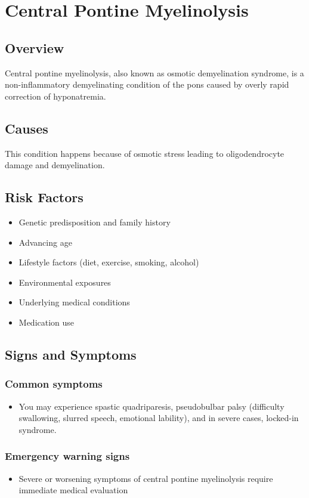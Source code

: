 \chapter{Central Pontine Myelinolysis}
\label{sec:Central Pontine Myelinolysis}

\section{Overview}
Central pontine myelinolysis, also known as osmotic demyelination syndrome, is a non-inflammatory demyelinating condition of the pons caused by overly rapid correction of hyponatremia.
\section{Causes}
This condition happens because of osmotic stress leading to oligodendrocyte damage and demyelination.     
\section{Risk Factors}

\begin{itemize}[noitemsep]
  \item Genetic predisposition and family history
  \item Advancing age
  \item Lifestyle factors (diet, exercise, smoking, alcohol)
  \item Environmental exposures
  \item Underlying medical conditions
  \item Medication use
\end{itemize}
\section{Signs and Symptoms}

\subsection{Common symptoms}
\begin{itemize}[noitemsep]
  \item You may experience spastic quadriparesis, pseudobulbar palsy (difficulty swallowing, slurred speech, emotional lability), and in severe cases, locked-in syndrome. 
  \end{itemize}

\subsection{Emergency warning signs}
\begin{itemize}[noitemsep]
  \item Severe or worsening symptoms of central pontine myelinolysis require immediate medical evaluation
\end{itemize}
